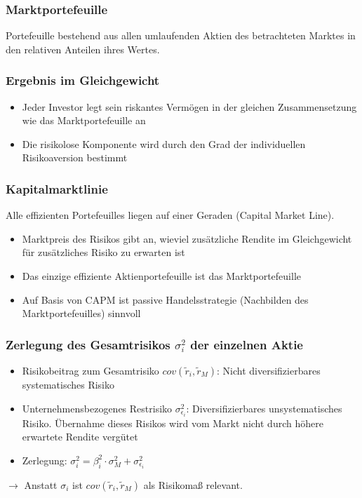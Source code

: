 \subsubsection{Marktportefeuille}
Portefeuille bestehend aus allen umlaufenden Aktien des betrachteten Marktes in den relativen Anteilen ihres Wertes.

\subsubsection{Ergebnis im Gleichgewicht}
\begin{itemize}
	\item Jeder Investor legt sein riskantes Vermögen in der gleichen Zusammensetzung wie das Marktportefeuille an
	\item Die risikolose Komponente wird durch den Grad der individuellen Risikoaversion bestimmt
\end{itemize}

\subsubsection{Kapitalmarktlinie}
Alle effizienten Portefeuilles liegen auf einer Geraden (Capital Market Line).
\begin{itemize}
	\item Marktpreis des Risikos gibt an, wieviel zusätzliche Rendite im Gleichgewicht für zusätzliches Risiko zu erwarten ist
	\item Das einzige effiziente Aktienportefeuille ist das Marktportefeuille
	\item Auf Basis von CAPM ist passive Handelsstrategie (Nachbilden des Marktportefeuilles) sinnvoll
\end{itemize}

\subsubsection{Zerlegung des Gesamtrisikos \(\sigma_i^2\) der einzelnen Aktie}
\begin{itemize}
	\item Risikobeitrag zum Gesamtrisiko \(cov(\tilde{r}_i, \tilde{r}_M)\): Nicht diversifizierbares systematisches Risiko
	\item Unternehmensbezogenes Restrisiko \(\sigma_{\epsilon_i}^2\): Diversifizierbares unsystematisches Risiko. Übernahme dieses Risikos wird vom Markt nicht durch höhere erwartete Rendite vergütet
	\item Zerlegung: \(\sigma_i^2 = \beta_i^2 \cdot \sigma_M^2 + \sigma_{\epsilon_i}^2\)
\end{itemize}
$\rightarrow$ Anstatt \(\sigma_i\) ist \(cov(\tilde{r}_i, \tilde{r}_M)\) als Risikomaß relevant.

